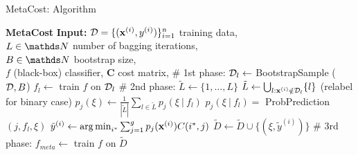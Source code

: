 \documentclass[11pt,compress,t,notes=noshow, xcolor=table]{beamer}
\begin{document}
\begin{vbframe}{MetaCost: Algorithm}
{\begin{minipage}{0.45\textwidth}
\begin{algorithmic}
				\tiny
%				
				\State \textbf{MetaCost}  
				\State \textbf{Input:} 
				$\mathcal{D} = \{(\mathbf{x}^{(i)},y^{(i)})\}_{i=1}^n$ training data, \\
				$L \in \N$ number of bagging iterations, \\
				$B \in \N$ bootstrap size, \\
				$f$ (black-box) classifier, 
				$\mathbf{C}$ cost matrix, 
				\State \# 1st phase:
					\State $\mathcal{D}_l  \leftarrow $ BootstrapSample ($\mathcal{D},B$)
					\State $f_l  \leftarrow $ train $f$ on $\mathcal{D}_l$
				\EndFor
				\State \# 2nd phase:
						\State $\tilde L \leftarrow \{1,\ldots,L\}$
					\Else
						\State $\tilde L \leftarrow \bigcup_{l: \mathbf{x}^{(i)} \notin \mathcal{D}_l} \{l\}$
					\EndIf
					 (relabel for binary case)
						\State $p_j(\xi)  \leftarrow \frac{1}{|\tilde L| } \sum_{l \in \tilde L}   p_j(\xi~|~ f_l) $
						\State $p_j(\xi~|~ f_l) = $ ProbPrediction$(j,f_l,\xi)$
						\State $\tilde y^{(i)} \leftarrow \operatorname{arg\,min}_{i^*} \sum_{j=1}^g p_j(\mathbf{x}^{(i)}) C(i^*,j) $
					\EndFor
					\State $\tilde D \leftarrow \tilde D \cup \{(\xi,\tilde y^{(i)})\} $
				\EndFor
				\State \# 3rd phase:
%				
				\State $f_{meta} \leftarrow$ train $f$ on $\tilde D$
%			
			\end{algorithmic}
		\end{minipage}
	}
\end{vbframe}
\end{document}
